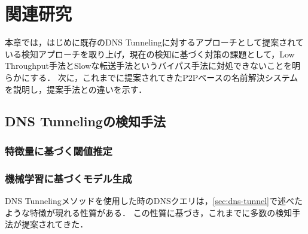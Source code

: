 \section{関連研究}
\label{sec:related-works}
本章では，はじめに既存のDNS Tunnelingに対するアプローチとして提案されている検知アプローチを取り上げ，現在の検知に基づく対策の課題として，Low Throughput手法とSlowな転送手法というバイパス手法に対処できないことを明らかにする．
次に，これまでに提案されてきたP2Pベースの名前解決システムを説明し，提案手法との違いを示す．

\subsection{DNS Tunnelingの検知手法}
\subsubsection{特徴量に基づく閾値推定}
\subsubsection{機械学習に基づくモデル生成}
DNS Tunnelingメソッドを使用した時のDNSクエリは，\ref{sec:dns-tunnel}で述べたような特徴が現れる性質がある．
この性質に基づき，これまでに多数の検知手法が提案されてきた．


